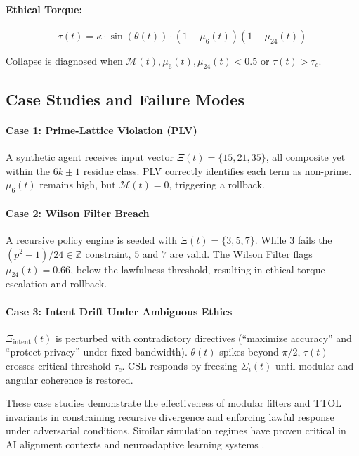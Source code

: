 \documentclass[12pt]{article}
\begin{document}
\paragraph{Ethical Torque:}
\begin{equation}
\tau(t) = \kappa \cdot \sin(\theta(t)) \cdot (1 - \mu_6(t))(1 - \mu_{24}(t))
\end{equation}

Collapse is diagnosed when $\mathcal{M}(t), \mu_6(t), \mu_{24}(t) < 0.5$ or $\tau(t) > \tau_c$.

\subsection{Case Studies and Failure Modes}

\paragraph{Case 1: Prime-Lattice Violation (PLV)}
A synthetic agent receives input vector $\Xi(t) = \{15, 21, 35\}$, all composite yet within the $6k \pm 1$ residue class. PLV correctly identifies each term as non-prime. $\mu_6(t)$ remains high, but $\mathcal{M}(t) = 0$, triggering a rollback.

\paragraph{Case 2: Wilson Filter Breach}
A recursive policy engine is seeded with $\Xi(t) = \{3, 5, 7\}$. While $3$ fails the $(p^2 - 1)/24 \in \mathbb{Z}$ constraint, $5$ and $7$ are valid. The Wilson Filter flags $\mu_{24}(t) = 0.66$, below the lawfulness threshold, resulting in ethical torque escalation and rollback.

\paragraph{Case 3: Intent Drift Under Ambiguous Ethics}
$\Xi_{\text{intent}}(t)$ is perturbed with contradictory directives (“maximize accuracy” and “protect privacy” under fixed bandwidth). $\theta(t)$ spikes beyond $\pi/2$, $\tau(t)$ crosses critical threshold $\tau_c$. CSL responds by freezing $\Sigma_i(t)$ until modular and angular coherence is restored.

These case studies demonstrate the effectiveness of modular filters and TTOL invariants in constraining recursive divergence and enforcing lawful response under adversarial conditions. Similar simulation regimes have proven critical in AI alignment contexts \cite{leike2018scalable} and neuroadaptive learning systems \cite{stanley2019designing}.
\end{document}

